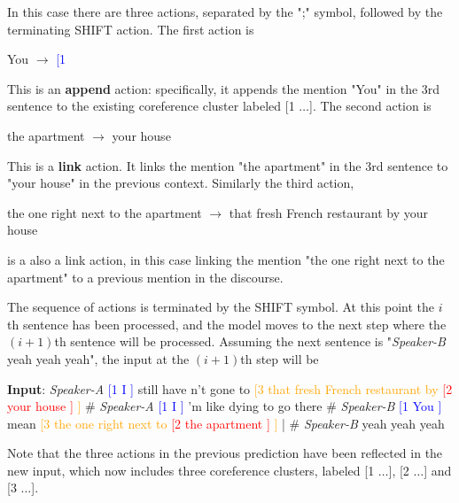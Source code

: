 \documentclass[11pt,a4paper]{article}
\begin{document}
$\;$
\vspace{2ex}

\noindent
In this case there are three actions, separated by the ";" symbol, followed by the terminating {\sc SHIFT} action. The first action is

\vspace{2ex}
\noindent
You $\rightarrow$ \textcolor{blue}{[1}

\vspace{2ex}
\noindent
This is an {\bf append} action: specifically, it appends the mention "You" in the 3rd sentence to the existing coreference cluster labeled [1 $\ldots$]. The second action is

\vspace{2ex}
\noindent
the apartment  $\rightarrow$ your house

\vspace{2ex}
\noindent
This is a {\bf link} action. It links the mention "the apartment" in the 3rd sentence to "your house" in the previous context. Similarly the third action,

\vspace{2ex}
\noindent
the one right next to the apartment $\rightarrow$ that fresh French restaurant by your house

\vspace{2ex}
\noindent
is a also a link action, in this case linking the mention "the one right next to the apartment" to a previous mention in the discourse.

The sequence of actions is terminated by the {\sc SHIFT} symbol. At this point the $i$th sentence has been processed, and the model moves to the next step where the $(i+1)$th sentence will be processed. Assuming the next sentence is "{\it Speaker-B} yeah yeah yeah", the input at the $(i+1)$th step will be

\vspace{2ex}
\noindent
{\bf Input}:
{\it Speaker-A} \textcolor{blue}{[1 I ]} still have n't gone to \textcolor{orange}{[3 that fresh French restaurant by \textcolor{red}{ [2 your house ]} ]} \# {\it Speaker-A} \textcolor{blue}{[1 I ]} 'm like dying to go there \# {\it Speaker-B} \textcolor{blue}{[1 You ]} mean \textcolor{orange}{[3 the one right next to \textcolor{red}{[2 the apartment ]} ] } | \# {\it Speaker-B} yeah yeah yeah

\vspace{2ex}
\noindent
Note that the three actions in the previous prediction have been reflected in the new input, which now includes three coreference clusters, labeled [1 $\ldots$], [2 $\ldots$] and [3 $\ldots$].
\end{document}

